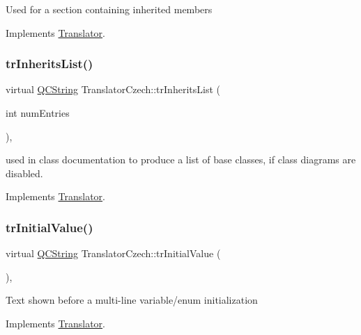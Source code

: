 Used for a section containing inherited members 

Implements \mbox{\hyperlink{class_translator}{Translator}}.

\mbox{\label{class_translator_czech_a89ba82a9a80bb51ff8ec66d3e7be7460}} 
\subsubsection{\texorpdfstring{trInheritsList()}{trInheritsList()}}
{\footnotesize\ttfamily virtual \mbox{\hyperlink{class_q_c_string}{Q\+C\+String}} Translator\+Czech\+::tr\+Inherits\+List (\begin{DoxyParamCaption}\item[{int}]{num\+Entries }\end{DoxyParamCaption})\hspace{0.3cm}{\ttfamily [inline]}, {\ttfamily [virtual]}}

used in class documentation to produce a list of base classes, if class diagrams are disabled. 

Implements \mbox{\hyperlink{class_translator}{Translator}}.

\mbox{\label{class_translator_czech_a9ea398360d7e755599b3db137c798cb4}} 
\subsubsection{\texorpdfstring{trInitialValue()}{trInitialValue()}}
{\footnotesize\ttfamily virtual \mbox{\hyperlink{class_q_c_string}{Q\+C\+String}} Translator\+Czech\+::tr\+Initial\+Value (\begin{DoxyParamCaption}{ }\end{DoxyParamCaption})\hspace{0.3cm}{\ttfamily [inline]}, {\ttfamily [virtual]}}

Text shown before a multi-\/line variable/enum initialization 

Implements \mbox{\hyperlink{class_translator}{Translator}}.

\mbox{\label{class_translator_czech_a0bea8191ff76ae1dc265d1762a0c812f}} 
